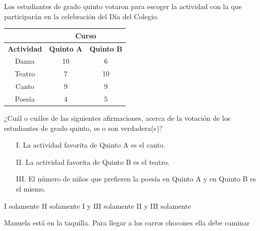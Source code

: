\documentclass[10pt,letterpaper,addpoints]{exam}
\begin{document}
\begin{multicols}{2}
\begin{questions}
{Los estudiantes de grado quinto votaron para escoger la actividad con la que participarán en la celebración del Día del Colegio.}
\begin{center}
\begin{tabular}{|c|c|c|}
\hline 
 & \multicolumn{2}{c|}{Curso} \\ 
\hline 
\textbf{Actividad} & \textbf{Quinto A} & \textbf{Quinto B} \\ 
\hline 
Danza & 10 & 6 \\ 
\hline 
Teatro & 7 & 10 \\ 
\hline 
Canto & 9 & 9 \\ 
\hline 
Poes\'{i}a & 4 & 5 \\ 
\hline 
\end{tabular} 
\end{center}
\question \label{q-01}
¿Cuál o cuáles de las siguientes afirmaciones, acerca de la votación de los estudiantes de grado quinto, es o son verdadera(s)?
\begin{itemize}
\item[I.] La actividad favorita de Quinto A es el canto.
\item[II.] La actividad favorita de Quinto B es el teatro.
\item[III.] El número de niños que prefieren la poesía en Quinto A y en Quinto B es el mismo.
\end{itemize}
\begin{choices}
\choice I solamente
\CorrectChoice II solamente
\choice I y III solamente
\choice II y III solamente
\end{choices}
\question Manuela está en la taquilla. Para llegar a los carros chocones ella debe caminar

\end{questions}
\end{multicols}
\end{document}
